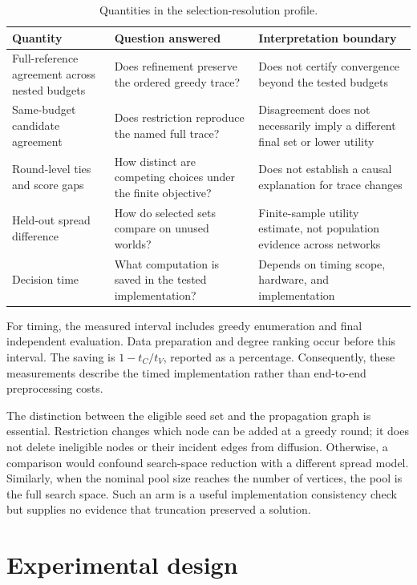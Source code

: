 \documentclass[smallextended]{svjour3}
\begin{document}
\begin{table}[tbp]
\caption{Quantities in the selection-resolution profile.}
\label{tab:1}
\begin{tabularx}{\linewidth}{@{}L{.25\linewidth}L{.32\linewidth}Y@{}}
\toprule
\textbf{Quantity} & \textbf{Question answered} & \textbf{Interpretation boundary} \\
\midrule
Full-reference agreement across nested budgets & Does refinement preserve the ordered greedy trace? & Does not certify convergence beyond the tested budgets \\
Same-budget candidate agreement & Does restriction reproduce the named full trace? & Disagreement does not necessarily imply a different final set or lower utility \\
Round-level ties and score gaps & How distinct are competing choices under the finite objective? & Does not establish a causal explanation for trace changes \\
Held-out spread difference & How do selected sets compare on unused worlds? & Finite-sample utility estimate, not population evidence across networks \\
Decision time & What computation is saved in the tested implementation? & Depends on timing scope, hardware, and implementation \\
\bottomrule
\end{tabularx}
\end{table}

For timing, the measured interval includes greedy enumeration and final independent evaluation. Data preparation and degree ranking occur before this interval. The saving is \(1-t_{C}/t_{V}\), reported as a percentage. Consequently, these measurements describe the timed implementation rather than end-to-end preprocessing costs.

The distinction between the eligible seed set and the propagation graph is essential. Restriction changes which node can be added at a greedy round; it does not delete ineligible nodes or their incident edges from diffusion. Otherwise, a comparison would confound search-space reduction with a different spread model. Similarly, when the nominal pool size reaches the number of vertices, the pool is the full search space. Such an arm is a useful implementation consistency check but supplies no evidence that truncation preserved a solution.

\FloatBarrier


\section{Experimental design}
\end{document}
